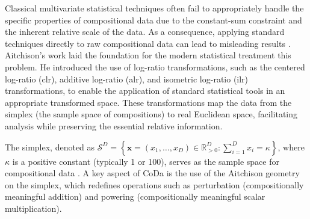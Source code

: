 \documentclass[
	12pt,				%
	oneside,			%
	a4paper,			%
	english,			%
	brazil				%
	]{abntex2ppgsi}
\begin{document}
Classical multivariate statistical techniques often fail to appropriately handle the specific properties of compositional data due to the constant-sum constraint and the inherent relative scale of the data. As a consequence, applying standard techniques directly to raw compositional data can lead to misleading results \cite{pawlowsky2015modelling}. Aitchison's work \cite{aitchison1986statistical} laid the foundation for the modern statistical treatment this problem. He introduced the use of log-ratio transformations, such as the centered log-ratio (clr), additive log-ratio (alr), and isometric log-ratio (ilr) transformations, to enable the application of standard statistical tools in an appropriate transformed space. These transformations map the data from the simplex (the sample space of compositions) to real Euclidean space, facilitating analysis while preserving the essential relative information.

The simplex, denoted as $\mathcal{S}^D = \left\{ \mathbf{x} = (x_1, \ldots, x_D) \in \mathbb{R}^D_{>0} : \sum_{i=1}^D x_i = \kappa \right\}$, where $\kappa$ is a positive constant (typically 1 or 100), serves as the sample space for compositional data \cite{egozcue2003isometric}. A key aspect of CoDa is the use of the Aitchison geometry on the simplex, which redefines operations such as perturbation (compositionally meaningful addition) and powering (compositionally meaningful scalar multiplication).



\end{document}

